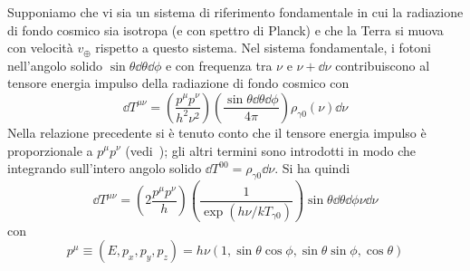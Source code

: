 Supponiamo che vi sia un sistema di riferimento fondamentale in cui la
radiazione di fondo cosmico sia isotropa (e con spettro di Planck) e che la
Terra si muova con velocità $v_{\oplus}$ rispetto a questo sistema.  Nel sistema
fondamentale, i fotoni nell'angolo solido $\sin \theta \dd \theta \dd \phi$ e
con frequenza tra $\nu$ e $\nu + \dd\nu$ contribuiscono al tensore energia
impulso della radiazione di fondo cosmico con
\begin{equation}
  \dd T^{\mu \nu}=  \left( \frac{p^{\mu} p^{\nu}}{h^2 \nu^2} \right)
                  \left( \frac{\sin\theta \dd\theta \dd\phi}{4\pi} \right)
  \rho_{\gamma 0}(\nu) \dd\nu
\label{521}
\end{equation}
Nella relazione precedente si è tenuto conto che il tensore energia impulso è
proporzionale a $p^{\mu} p^{\nu}$ (vedi~\cite[44]{weinberg:gravitation}); gli
altri termini sono introdotti in modo che integrando sull'intero angolo solido
$\dd T^{00} = \rho_{\gamma 0} \dd \nu$.  Si ha quindi
\begin{equation}
  \dd T^{\mu \nu}= \left( 2 \frac{ p^{\mu} p^{\nu} }{h} \right)
                   \left( \frac{1} { \exp (h \nu/ kT_{\gamma 0 }) } \right)
  \sin \theta \dd\theta \dd\phi \nu \dd\nu
\label{522}
\end{equation}
con
\begin{equation}
  p^{\mu} \equiv (E, p_x, p_y, p_z) =
  h \nu ( 1, \sin \theta \cos \phi , \sin \theta \sin \phi, \cos \theta)
\end{equation}


